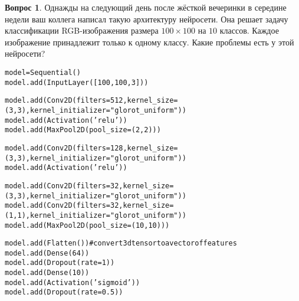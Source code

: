 \documentclass[12pt]{article}
\theoremstyle{definition}
\newtheorem{question}{Вопрос}
\begin{document}
\begin{question} 
Однажды на следующий день после жёсткой вечеринки в середине недели ваш коллега написал такую архитектуру нейросети. Она решает задачу классификации RGB-изображения  размера $100 \times 100$ на $10$ классов. Каждое изображение принадлежит только к одному классу. Какие проблемы есть у этой нейросети? 

\begin{alltt}
        model = Sequential() 
        model.add(InputLayer([100, 100, 3]))
        
        model.add(Conv2D(filters=512, kernel\_size=(3, 3), kernel\_initializer="glorot_uniform")) 
        model.add(Activation('relu'))
        model.add(MaxPool2D(pool_size=(2, 2)))
        
        model.add(Conv2D(filters=128, kernel\_size=(3, 3), kernel\_initializer="glorot_uniform")) 
        model.add(Activation('relu'))
        
        model.add(Conv2D(filters=32, kernel\_size=(3, 3), kernel\_initializer="glorot_uniform"))
        model.add(Conv2D(filters=32, kernel\_size=(1, 1), kernel\_initializer="glorot_uniform"))
        model.add(MaxPool2D(pool_size=(10, 10)))
        
        model.add(Flatten()) # convert 3d tensor to a vector of features
        model.add(Dense(64))
        model.add(Dropout(rate=1))
        model.add(Dense(10))
        model.add(Activation('sigmoid'))
        model.add(Dropout(rate=0.5))
\end{alltt}
\end{question}


\end{document}
